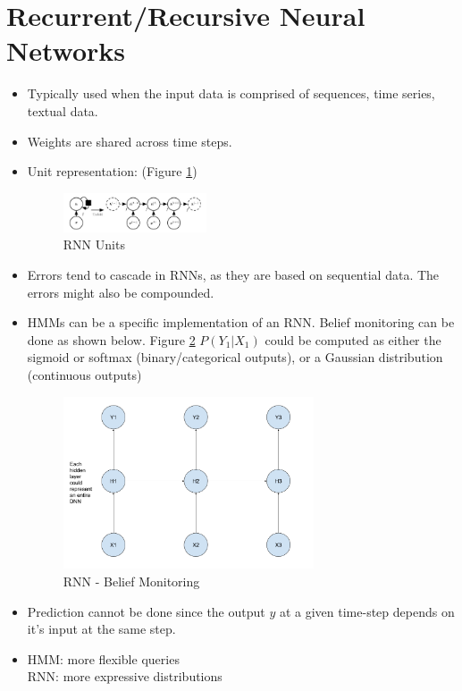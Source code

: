 \documentclass[parskip=half]{scrartcl}
\begin{document}



\newpage


\section{Recurrent/Recursive Neural Networks} %
\label{sec:recurrent_recursive_neural_networks}

    \begin{itemize}
        \item 
        Typically used when the input data is comprised of sequences, time series, textual data.
        \item 
        Weights are shared across time steps.
        \item 
        Unit representation: (Figure \ref{fig:rnn-units})
        \begin{figure}[ht]
            \centering
            \includegraphics[width=0.4\textwidth]{rnn-units}
            \caption{RNN Units}
            \label{fig:rnn-units}
        \end{figure}
        \item 
        Errors tend to cascade in RNNs, as they are based on sequential data. The errors might also be compounded.
        \item 
        HMMs can be a specific implementation of an RNN. 
        Belief monitoring can be done as shown below. Figure \ref{fig:rnn}
        $P(Y_1|X_1)$ could be computed as either the sigmoid or softmax (binary/categorical outputs), or a Gaussian distribution (continuous outputs)
        \begin{figure}[ht]
            \centering
            \includegraphics[width=0.7\textwidth]{rnn}
            \caption{RNN - Belief Monitoring}
            \label{fig:rnn}
        \end{figure}
        \item 
        Prediction cannot be done since the output $y$ at a given time-step depends on it's input at the same step.
        \item 
        HMM: more flexible queries\\
        RNN: more expressive distributions
    \end{itemize}
\end{document}
